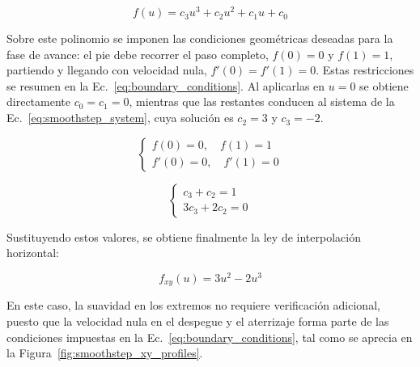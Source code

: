 \vspace{-1.5\baselineskip}
\setlength{\abovedisplayskip}{0pt}
\setlength{\abovedisplayshortskip}{0pt}
\begin{equation}
    f(u) = c_3u^3 + c_2u^2 + c_1u + c_0
    \label{eq:smoothstep_poly_general}
\end{equation}
\vspace{-1\baselineskip}

Sobre este polinomio se imponen las condiciones geométricas deseadas para la fase de avance: el pie debe recorrer el paso completo, $f(0)=0$ y $f(1)=1$, partiendo y llegando con velocidad nula, $f'(0)=f'(1)=0$. Estas restricciones se resumen en la Ec.~\ref{eq:boundary_conditions}. Al aplicarlas en $u=0$ se obtiene directamente $c_0=c_1=0$, mientras que las restantes conducen al sistema de la Ec.~\ref{eq:smoothstep_system}, cuya solución es $c_2=3$ y $c_3=-2$.
\vspace{-1\baselineskip}

\noindent
\begin{minipage}[t]{0.48\textwidth}
    \begin{equation}
    \begin{cases}
        f(0) = 0, \quad f(1) = 1 \\
        f'(0) = 0, \quad f'(1) = 0
    \end{cases}
    \label{eq:boundary_conditions}
\end{equation}
    \end{minipage}
\hfill
\begin{minipage}[t]{0.48\textwidth}
    \begin{equation}
    \begin{cases}
        c_3 + c_2 = 1 \\
        3c_3 + 2c_2 = 0
    \end{cases}
    \label{eq:smoothstep_system}
\end{equation}
    \end{minipage}

Sustituyendo estos valores, se obtiene finalmente la ley de interpolación horizontal:

\vspace{-1.0\baselineskip}
\begin{equation}
    f_{xy}(u) = 3u^2 - 2u^3
    \label{eq:smoothstep_xy_derived}
\end{equation}
\vspace{-1.0\baselineskip}

En este caso, la suavidad en los extremos no requiere verificación adicional, puesto que la velocidad nula en el despegue y el aterrizaje forma parte de las condiciones impuestas en la Ec.~\ref{eq:boundary_conditions}, tal como se aprecia en la Figura~\ref{fig:smoothstep_xy_profiles}.

